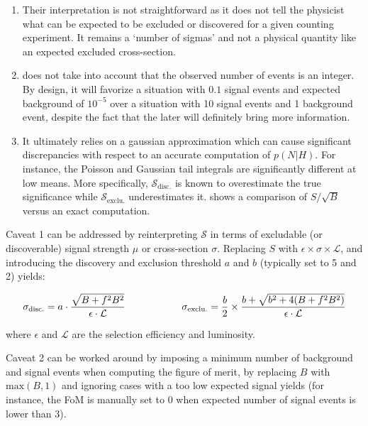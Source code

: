     \begin{enumerate}
      \item Their interpretation is not straightforward as it does not tell the
            physicist what can be expected to be excluded or discovered
            for a given counting experiment. It remains a `number of sigmas' and not a
            physical quantity like an expected excluded cross-section.
      \item {} does not take into account that
            the observed number of events is an integer. By design, it will favorize a situation
            with $0.1$ signal events and expected background of $10^{-5}$ over a
            situation with 10 signal events and 1 background event, despite the fact that
            the later will definitely bring more information.
      \item It ultimately relies on a gaussian approximation which can cause significant
            discrepancies with respect to an accurate computation of $p(N|H)$. For instance,
            the Poisson and Gaussian tail integrals are significantly different at low
            means. More specifically, $\mathcal{S}_\text{disc.}$ is known to overestimate
            the true significance while $\mathcal{S}_\text{exclu.}$ underestimates it.
             shows a comparison of $S/\sqrt{B}$ versus an exact
            computation.
    \end{enumerate}

    Caveat 1 can be addressed by reinterpreting $\mathcal{S}$ in terms of excludable
    (or discoverable) signal strength $\mu$ or cross-section $\sigma$. Replacing
    $S$ with $\epsilon \times \sigma \times \mathcal{L}$, and introducing the discovery
    and exclusion threshold $a$ and $b$ (typically set to 5 and 2) yields:

    \begin{equation}
        \mathcal{\sigma}_\text{disc.} = a \cdot \frac{\sqrt{B+f^2B^2}}{\epsilon \cdot \mathcal{L}}
       \hspace*{2cm}
       \mathcal{\sigma}_\text{exclu.} = \frac{b}{2} \times \frac{b + \sqrt{b^2 + 4 (B + f^2B^2)}}{\epsilon \cdot \mathcal{L}}
       \label{FoM2}
    \end{equation}

    where $\epsilon$ and $\mathcal{L}$ are the selection efficiency and luminosity.

    Caveat 2 can be worked around by imposing a minimum number of background and signal
    events when computing the figure of merit, by replacing $B$ with $\text{max}(B,1)$
    and ignoring cases with a too low expected signal yields (for instance, the FoM is
    manually set to 0 when expected number of signal events is lower than 3).

